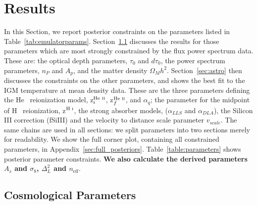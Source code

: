 \section{Results}\label{sec:results}

In this Section, we report posterior constraints on the parameters listed in Table~\ref{tab:emulatorparams}.
Section~\ref{sec:cosmo} discusses the results for those parameters which are most strongly constrained by the flux power spectrum data.
These are: the optical depth parameters, $\tau_0$ and $d\tau_0$, the power spectrum parameters, $n_P$ and $A_p$, and the matter density $\Omega_M h^2$.
Section~\ref{sec:astro} then discusses the constraints on the other parameters, and shows the best fit to the IGM temperature at mean density data.
These are the three parameters defining the He~{} reionization model, z$^{\text{He~{\sc ii}}}_i$, z$^{\text{He~{\sc ii}}}_f$, and $\alpha_q$; the parameter for the midpoint of H~{} reionization, z$^{\text{H~{\sc i}}}$, the strong absorber models, ($\alpha_{LLS}$ and $\alpha_{DLA}$), the Silicon III correction (fSiIII) and the velocity to distance scale parameter $v_{scale}$.
The same chains are used in all sections: we split parameters into two sections merely for readability.
We show the full corner plot, containing all constrained parameters, in Appendix~\ref{sec:full_posteriors}.
Table~\ref{table:parameters} shows posterior parameter constraints. \textbf{We also calculate the derived parameters $A_s$ and $\sigma_8$, $\Delta_L^2$ and $n_\mathrm{eff}$}.


\subsection{Cosmological Parameters}\label{sec:cosmo}

